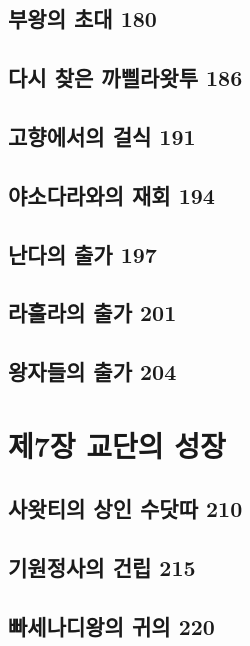\documentclass[12pt, a4paper, oneside]{book}
\let\stdsection\section
\renewcommand\section{\newpage\stdsection}
\begin{document}
	\section{부왕의 초대 180 }

	\section{다시 찾은 까삘라왓투 186 }

	\section{고향에서의 걸식 191 }

	\section{야소다라와의 재회 194 }

	\section{난다의 출가 197 }

	\section{라훌라의 출가 201 }

	\section{왕자들의 출가 204}





	\chapter{제7장 교단의 성장}
	\noptcrule
	\parttoc				

	\section{사왓티의 상인 수닷따 210 }

	\section{기원정사의 건립 215 }

	\section{빠세나디왕의 귀의 220 }
\end{document}

